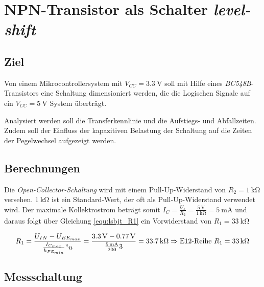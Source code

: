 \documentclass[../main.tex]{subfiles}
\begin{document}
\section{NPN-Transistor als Schalter \textit{level-shift}}

\subsection{Ziel}

Von einem Mikrocontrollersystem mit $V_{CC} = \SI{3.3}{\volt}$ soll mit Hilfe eines \textit{BC548B}-Transistors eine Schaltung dimensioniert werden, die die Logischen Signale auf ein $V_{CC} = \SI{5}{\volt}$ System überträgt.

Analysiert werden soll die Transferkennlinie und die Aufstiegs- und Abfallzeiten. Zudem soll der Einfluss der kapazitiven Belastung der Schaltung auf die Zeiten der Pegelwechsel aufgezeigt werden.

\subsection{Berechnungen}

Die \textit{Open-Collector-Schaltung} wird mit einem Pull-Up-Widerstand von $R_2 = \SI{1}{\kilo\ohm}$ versehen. $\SI{1}{\kilo\ohm}$ ist ein Standard-Wert, der oft als Pull-Up-Widerstand verwendet wird. Der maximale Kollektrostrom beträgt somit $I_C = \frac{U_s}{R_2} = \frac{\SI{5}{\volt}}{\SI{1}{\kilo\ohm}} = \SI{5}{\milli\ampere}$ und daraus folgt über Gleichung \ref{equ:lsbjt_R1} ein Vorwiderstand von $R_1 = \SI{33}{\kilo\ohm}$

\begin{equation}
    R_1 = \frac{U_{IN} - U_{BE_{max}}}{\frac{I_{C_{max}}}{h_{FE_{min}}} {"u}} = \frac{\SI{3.3}{\volt} - \SI{0.77}{\volt}}{\frac{\SI{5}{\milli\ampere}}{200}3} = \SI{33.7}{\kilo\ohm} \Rightarrow \textrm{E12-Reihe } R_{1} = \SI{33}{\kilo\ohm}
    \label{equ:lsbjt_R1}
\end{equation}

\newpage

\subsection{Messschaltung}
\end{document}
